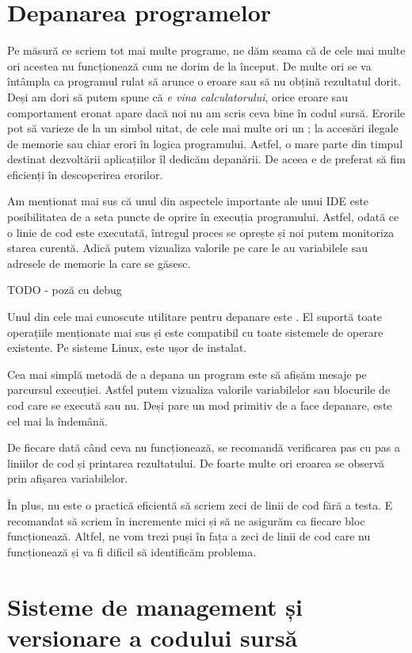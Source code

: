 \section{Depanarea programelor}
\label{sec:appdev-debugging}

Pe măsură ce scriem tot mai multe programe, ne dăm seama că de cele mai multe
ori acestea nu funcționează cum ne dorim de la început. De multe ori se va
întâmpla ca programul rulat să arunce o eroare sau să nu obțină rezultatul
dorit. Deși am dori să putem spune că \textit{e vina calculatorului}, orice
eroare sau comportament eronat apare dacă noi nu am scris ceva bine în codul
sursă. Erorile pot să varieze de la un simbol uitat, de cele mai multe ori un ;
la accesări ilegale de memorie sau chiar erori în logica programului. Astfel, o
mare parte din timpul destinat dezvoltării aplicațiilor îl dedicăm depanării. De
aceea e de preferat să fim eficienți în descoperirea erorilor.

Am menționat mai sus că unul din aspectele importante ale unui IDE este
posibilitatea de a seta puncte de oprire în execuția programului. Astfel, odată
ce o linie de cod este executată, întregul proces se oprește și noi putem
monitoriza starea curentă. Adică putem vizualiza valorile pe care le au
variabilele sau adresele de memorie la care se găsesc.

TODO - poză cu debug

Unul din cele mai cunoscute utilitare pentru depanare este . El suportă
toate operațiile menționate mai sus și este compatibil cu toate sistemele de
operare existente. Pe sisteme Linux, este ușor de instalat.

Cea mai simplă metodă de a depana un program este să afișăm mesaje pe parcursul
execuției. Astfel putem vizualiza valorile variabilelor sau blocurile de cod
care se execută sau nu. Deși pare un mod primitiv de a face depanare, este cel
mai la îndemână.

De fiecare dată când ceva nu funcționează, se recomandă verificarea pas cu pas a
liniilor de cod și printarea rezultatului. De foarte multe ori eroarea se
observă prin afișarea variabilelor.

În plus, nu este o practică eficientă să scriem zeci de linii de cod fără a
testa. E recomandat să scriem în incremente mici și să ne asigurăm ca fiecare
bloc funcționează. Altfel, ne vom trezi puși în fața a zeci de linii de cod care
nu funcționează și va fi dificil să identificăm problema.

\section{Sisteme de management și versionare a codului sursă}
\label{sec:appdev-versioning}

